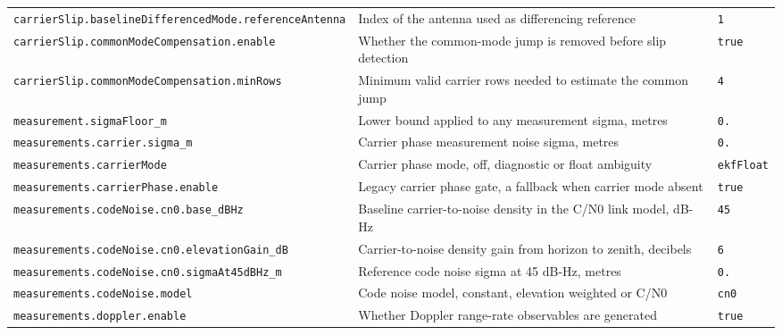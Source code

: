 \begin{center}
\begin{longtable}{>{\raggedright\arraybackslash\scriptsize\ttfamily}p{}|>{\raggedright\arraybackslash}p{}|>{\raggedright\arraybackslash\scriptsize\ttfamily}p{}}
\texttt{carrier\allowbreak Slip.\allowbreak baseline\allowbreak Differenced\allowbreak Mode.\allowbreak reference\allowbreak Antenna} & Index of the antenna used as differencing reference & \texttt{1} \\
\texttt{carrier\allowbreak Slip.\allowbreak common\allowbreak Mode\allowbreak Compensation.\allowbreak enable} & Whether the common-mode jump is removed before slip detection & \texttt{true} \\
\texttt{carrier\allowbreak Slip.\allowbreak common\allowbreak Mode\allowbreak Compensation.\allowbreak min\allowbreak Rows} & Minimum valid carrier rows needed to estimate the common jump & \texttt{4} \\
\texttt{measurement.\allowbreak sigma\allowbreak Floor\_\allowbreak m} & Lower bound applied to any measurement sigma, metres & \texttt{0.\allowbreak 01} \\
\texttt{measurements.\allowbreak carrier.\allowbreak sigma\_\allowbreak m} & Carrier phase measurement noise sigma, metres & \texttt{0.\allowbreak 01} \\
\texttt{measurements.\allowbreak carrier\allowbreak Mode} & Carrier phase mode, off, diagnostic or float ambiguity & \texttt{ekf\allowbreak Float} \\
\texttt{measurements.\allowbreak carrier\allowbreak Phase.\allowbreak enable} & Legacy carrier phase gate, a fallback when carrier mode absent & \texttt{true} \\
\texttt{measurements.\allowbreak code\allowbreak Noise.\allowbreak cn0.\allowbreak base\_\allowbreak d\allowbreak BHz} & Baseline carrier-to-noise density in the C/N0 link model, dB-Hz & \texttt{45} \\
\texttt{measurements.\allowbreak code\allowbreak Noise.\allowbreak cn0.\allowbreak elevation\allowbreak Gain\_\allowbreak d\allowbreak B} & Carrier-to-noise density gain from horizon to zenith, decibels & \texttt{6} \\
\texttt{measurements.\allowbreak code\allowbreak Noise.\allowbreak cn0.\allowbreak sigma\allowbreak At45d\allowbreak BHz\_\allowbreak m} & Reference code noise sigma at 45 dB-Hz, metres & \texttt{0.\allowbreak 3} \\
\texttt{measurements.\allowbreak code\allowbreak Noise.\allowbreak model} & Code noise model, constant, elevation weighted or C/N0 & \texttt{cn0} \\
\texttt{measurements.\allowbreak doppler.\allowbreak enable} & Whether Doppler range-rate observables are generated & \texttt{true} \\

\end{longtable}
\end{center}

